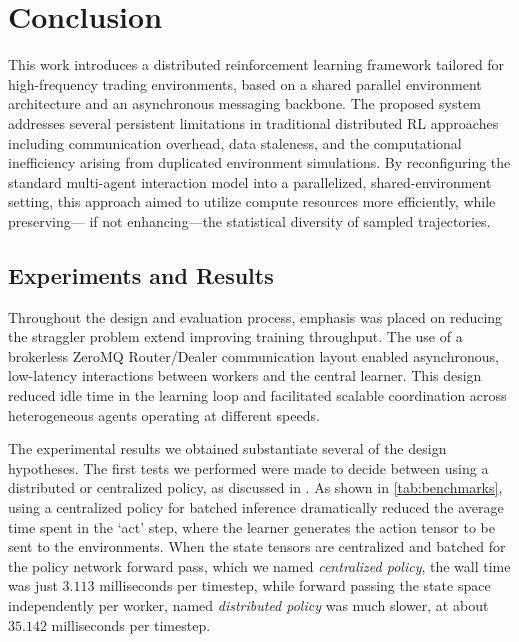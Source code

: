\chapter{Conclusion}
\label{ch:conclusion}

This work introduces a distributed reinforcement learning framework tailored for high-frequency trading environments,
based on a shared parallel environment architecture and an asynchronous messaging backbone.
The proposed system addresses several persistent limitations in traditional distributed RL approaches
including communication overhead, data staleness, and the computational inefficiency arising from duplicated environment simulations.
By reconfiguring the standard multi-agent interaction model into a parallelized,
shared-environment setting, this approach aimed to utilize compute resources more efficiently, while preserving---
if not enhancing---the statistical diversity of sampled trajectories.


\section{Experiments and Results}
\label{sec:results}

Throughout the design and evaluation process, emphasis was placed on reducing the straggler problem extend improving training throughput.
The use of a brokerless ZeroMQ Router/Dealer communication layout enabled asynchronous, low-latency interactions between workers and the central learner.
This design reduced idle time in the learning loop and facilitated scalable coordination across heterogeneous agents operating at different speeds.

The experimental results we obtained substantiate several of the design hypotheses.
The first tests we performed were made to decide between using a distributed or centralized policy, as discussed in .
As shown in \cref{tab:benchmarks}, using a centralized policy for batched inference dramatically reduced the average time spent in the `act' step,
where the learner generates the action tensor to be sent to the environments.
When the state tensors are centralized and batched for the policy network forward pass, which we named \textit{centralized policy},
the wall time was just $3.113$ milliseconds per timestep, while forward passing the state space independently per worker, named \textit{distributed policy}
was much slower, at about $35.142$ milliseconds per timestep.

